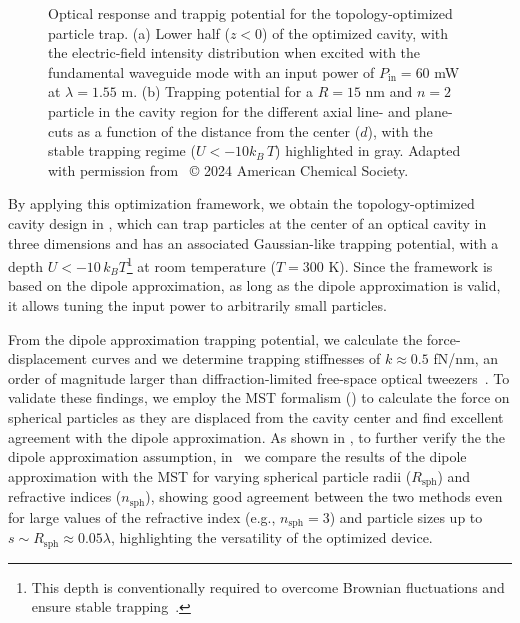 \begin{figure}[tb]
    \centering
    \caption{Optical response and trappig potential for the topology-optimized particle trap. (a) Lower half ($z<0$) of the optimized cavity, with the electric-field intensity
    distribution when excited with the fundamental waveguide mode with an input power of $P_\text{in}=60$ mW at $\lambda=1.55$ \textmu m. (b) Trapping potential for a $R=15$ nm and $n=2$ particle in the cavity region for the different axial line- and plane-cuts as a function
    of the distance from the center ($d$), with the stable trapping regime ($U<-10 k_B\, T$) highlighted in gray. Adapted with permission from~\cite{ownpub1} © 2024 American Chemical Society.}
    \label{fig:MST_dipole}
\end{figure}

By applying this optimization framework, we obtain the topology-optimized cavity design in , which can trap particles at the center of an optical
cavity in three dimensions and has an associated Gaussian-like trapping potential, with a depth  $U<-10\, k_B T$\footnote{This depth is conventionally required to overcome Brownian fluctuations and ensure stable trapping~\cite{novotny}.} at room temperature ($T=300$ K).
Since the framework is based on the dipole approximation,
as long as the dipole approximation is valid, it allows tuning the input power to arbitrarily small particles.

From the dipole approximation trapping potential, we calculate the force-displacement curves and we determine trapping stiffnesses
of $k \approx 0.5$ fN/nm, an order of magnitude larger than diffraction-limited free-space optical tweezers~\cite{ownpub1}. To validate these findings,
we employ the MST formalism () to calculate the force on spherical particles as they are displaced from the cavity center and find excellent
agreement with the dipole approximation. As shown in , to further verify the the dipole approximation assumption, in~\cite{ownpub3} we compare the results of the dipole approximation with the MST
for varying spherical particle radii ($R_\text{sph}$) and refractive indices ($n_\text{sph}$), showing good agreement between the two methods
even for large values of the refractive index (e.g., $n_\text{sph}=3$) and particle sizes up to $s \sim R_\text{sph}\approx 0.05 \lambda$, highlighting the versatility of the optimized device.

